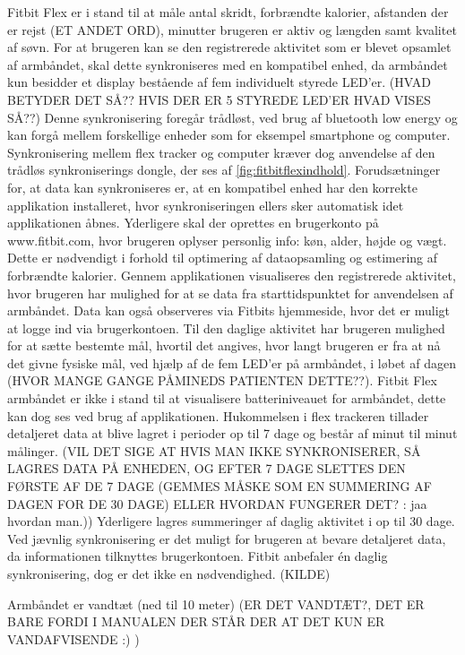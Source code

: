 Fitbit Flex er i stand til at måle antal skridt, forbrændte kalorier, afstanden der er rejst (ET ANDET ORD), minutter brugeren er aktiv og længden samt kvalitet af søvn. 
For at brugeren kan se den registrerede aktivitet som er blevet opsamlet af armbåndet, skal dette synkroniseres med en kompatibel enhed, da armbåndet kun besidder et display bestående af fem individuelt styrede LED'er. (HVAD BETYDER DET SÅ?? HVIS DER ER 5 STYREDE LED'ER HVAD VISES SÅ??)  
Denne synkronisering foregår trådløst, ved brug af bluetooth low energy og kan forgå mellem forskellige enheder som for eksempel smartphone og computer. 
Synkronisering mellem flex tracker og computer kræver dog anvendelse af den trådløs synkroniserings dongle, der ses af \autoref{fig:fitbitflexindhold}.
Forudsætninger for, at data kan synkroniseres er, at en kompatibel enhed har den korrekte applikation installeret, hvor synkroniseringen ellers sker automatisk idet applikationen åbnes.  
Yderligere skal der oprettes en brugerkonto på www.fitbit.com, hvor brugeren oplyser personlig info: køn, alder, højde og vægt. Dette er nødvendigt i forhold til optimering af dataopsamling og estimering af forbrændte kalorier.  
Gennem applikationen visualiseres den registrerede aktivitet, hvor brugeren har mulighed for at se data fra starttidspunktet for anvendelsen af armbåndet. Data kan også observeres via  Fitbits hjemmeside, hvor det er muligt at logge ind via brugerkontoen. 
Til den daglige aktivitet har brugeren mulighed for at sætte bestemte mål, hvortil det angives, hvor langt brugeren er fra at nå det givne fysiske mål, ved hjælp af de fem LED'er på armbåndet, i løbet af dagen (HVOR MANGE GANGE PÅMINEDS PATIENTEN DETTE??).
Fitbit Flex armbåndet er ikke i stand til at visualisere batteriniveauet for armbåndet, dette kan dog ses ved brug af applikationen. 
Hukommelsen i flex trackeren tillader detaljeret data at blive lagret i perioder op til 7 dage og består af minut til minut målinger. (VIL DET SIGE AT HVIS MAN IKKE SYNKRONISERER, SÅ LAGRES DATA PÅ ENHEDEN, OG EFTER 7 DAGE SLETTES DEN FØRSTE AF DE 7 DAGE (GEMMES MÅSKE SOM EN SUMMERING AF DAGEN FOR DE 30 DAGE) ELLER HVORDAN FUNGERER DET? : jaa hvordan man.)) 
Yderligere lagres summeringer af daglig aktivitet i op til 30 dage.
Ved jævnlig synkronisering er det muligt for brugeren at bevare detaljeret data, da informationen tilknyttes brugerkontoen. 
Fitbit anbefaler én daglig synkronisering, dog er det ikke en nødvendighed. (KILDE) 

Armbåndet er vandtæt (ned til 10 meter) (ER DET VANDTÆT?, DET ER BARE FORDI I MANUALEN DER STÅR DER AT DET KUN ER VANDAFVISENDE :) )

